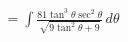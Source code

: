 \documentclass[preview]{standalone}
\begin{document}
\begin{align*}
&= \int \frac{81\tan^3\theta\sec^2\theta}{\sqrt{9\tan^2\theta+9}} \, d\theta \\
\end{align*}
\end{document}
